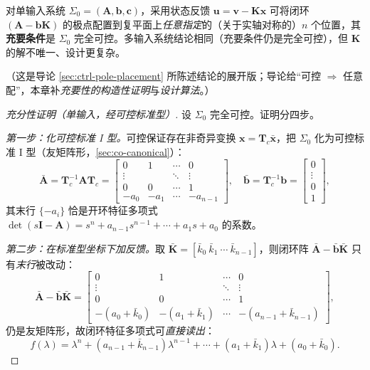 \begin{theorem}[极点配置定理]
\label{thm:syn-pole-placement}
对单输入系统 $\Sigma_0=(\mathbf A,\mathbf b,\mathbf c)$，采用状态反馈 $\mathbf u=\mathbf v-\mathbf K\mathbf x$ 可将闭环 $(\mathbf A-\mathbf b\mathbf K)$ 的极点配置到复平面上\emph{任意指定}的（关于实轴对称的）$n$ 个位置，其\textbf{充要条件}是 $\Sigma_0$ 完全可控\cite{liubao2006modern,wonham1967pole}。多输入系统结论相同（充要条件仍是完全可控），但 $\mathbf K$ 的解不唯一、设计更复杂。
\end{theorem}

\noindent{}（这是导论 \cref{sec:ctrl-pole-placement} 所陈述结论的展开版；导论给“可控 $\Rightarrow$ 任意配”，本章补\emph{充要性的构造性证明}与\emph{设计算法}。）

\begin{proof}[充分性证明（单输入，经可控标准型）]
设 $\Sigma_0$ 完全可控。证明分四步\cite{liubao2006modern}。

\emph{第一步：化可控标准 I 型。}\;可控保证存在非奇异变换 $\mathbf x=\mathbf T_c\bar{\mathbf x}$，把 $\Sigma_0$ 化为可控标准 I 型（友矩阵形，\cref{sec:co-canonical}）：
\begin{equation}
  \bar{\mathbf A}=\mathbf T_c^{-1}\mathbf A\mathbf T_c=\begin{bmatrix}0&1&\cdots&0\\\vdots&&\ddots&\vdots\\0&0&\cdots&1\\-a_0&-a_1&\cdots&-a_{n-1}\end{bmatrix},\quad \bar{\mathbf b}=\mathbf T_c^{-1}\mathbf b=\begin{bmatrix}0\\\vdots\\0\\1\end{bmatrix},
  \label{eq:syn-ccf}
\end{equation}
其末行 $\{-a_i\}$ 恰是开环特征多项式 $\det(s\mathbf I-\mathbf A)=s^n+a_{n-1}s^{n-1}+\cdots+a_1 s+a_0$ 的系数。

\emph{第二步：在标准型坐标下加反馈。}\;取 $\bar{\mathbf K}=[\bar k_0\ \bar k_1\ \cdots\ \bar k_{n-1}]$，则闭环阵 $\bar{\mathbf A}-\bar{\mathbf b}\bar{\mathbf K}$ 只有\emph{末行}被改动：
\begin{equation}
  \bar{\mathbf A}-\bar{\mathbf b}\bar{\mathbf K}=\begin{bmatrix}0&1&\cdots&0\\\vdots&&\ddots&\vdots\\0&0&\cdots&1\\-(a_0+\bar k_0)&-(a_1+\bar k_1)&\cdots&-(a_{n-1}+\bar k_{n-1})\end{bmatrix},
  \label{eq:syn-ccf-closed}
\end{equation}
仍是友矩阵形，故闭环特征多项式可\emph{直接读出}：
\begin{equation}
  f(\lambda)=\lambda^n+(a_{n-1}+\bar k_{n-1})\lambda^{n-1}+\cdots+(a_1+\bar k_1)\lambda+(a_0+\bar k_0).
  \label{eq:syn-closed-char}
\end{equation}


\end{proof}
